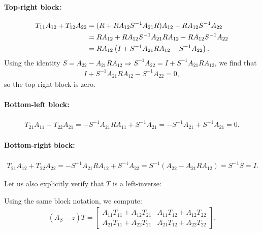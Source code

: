 \documentclass[reqno,12pt,letterpaper]{amsart}
\numberwithin{equation}{section}
\newcommand{\1}{\mathds{1}}
\theoremstyle{definition}
\begin{document}
	\paragraph{Top-right block:}
	\begin{align}
		T_{11} A_{12} + T_{12} A_{22}
		&= (R + R A_{12} S^{-1} A_{21} R) A_{12} - R A_{12} S^{-1} A_{22} \notag \\
		&= R A_{12} + R A_{12} S^{-1} A_{21} R A_{12} - R A_{12} S^{-1} A_{22} \notag \\
		&= R A_{12} \left( I + S^{-1} A_{21} R A_{12} - S^{-1} A_{22} \right).
	\end{align}
	Using the identity \( S = A_{22} - A_{21} R A_{12} \Rightarrow S^{-1} A_{22} = I + S^{-1} A_{21} R A_{12} \), we find that
	\begin{align}
		I + S^{-1} A_{21} R A_{12} - S^{-1} A_{22} = 0,
	\end{align}
	so the top-right block is zero.
	
	\paragraph{Bottom-left block:}
	\begin{align}
		T_{21} A_{11} + T_{22} A_{21}
		= -S^{-1} A_{21} R A_{11} + S^{-1} A_{21} = -S^{-1} A_{21} + S^{-1} A_{21} = 0.
	\end{align}
	
	\paragraph{Bottom-right block:}
	\begin{align}
		T_{21} A_{12} + T_{22} A_{22}
		= -S^{-1} A_{21} R A_{12} + S^{-1} A_{22} = S^{-1}(A_{22} - A_{21} R A_{12}) = S^{-1} S = I.
	\end{align}
	
	\medskip
	

	
	Let us also explicitly verify that $T$ is a left-inverse:
	
	 Using the same block notation, we compute:
	\begin{align}
		(A_\beta - z) T =
		\begin{bmatrix}
			A_{11} T_{11} + A_{12} T_{21} & A_{11} T_{12} + A_{12} T_{22} \\
			A_{21} T_{11} + A_{22} T_{21} & A_{21} T_{12} + A_{22} T_{22}
		\end{bmatrix}.
	\end{align}
	
\end{document}
